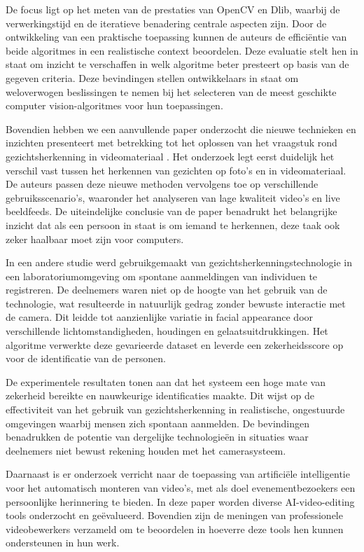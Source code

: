 De focus ligt op het meten van de prestaties van OpenCV en Dlib, waarbij de verwerkingstijd en de iteratieve benadering centrale aspecten zijn. Door de ontwikkeling van een praktische toepassing kunnen de auteurs de efficiëntie van beide algoritmes in een realistische context beoordelen. Deze evaluatie stelt hen in staat om inzicht te verschaffen in welk algoritme beter presteert op basis van de gegeven criteria. Deze bevindingen stellen ontwikkelaars in staat om weloverwogen beslissingen te nemen bij het selecteren van de meest geschikte computer vision-algoritmes voor hun toepassingen.

Bovendien hebben we een aanvullende paper onderzocht die nieuwe technieken en inzichten presenteert met betrekking tot het oplossen van het vraagstuk rond gezichtsherkenning in videomateriaal \autocite{Gorodnichy2020}. Het onderzoek legt eerst duidelijk het verschil vast tussen het herkennen van gezichten op foto's en in videomateriaal. De auteurs passen deze nieuwe methoden vervolgens toe op verschillende gebruiksscenario's, waaronder het analyseren van lage kwaliteit video's en live beeldfeeds. De uiteindelijke conclusie van de paper benadrukt het belangrijke inzicht dat als een persoon in staat is om iemand te herkennen, deze taak ook zeker haalbaar moet zijn voor computers.

In een andere studie werd gebruikgemaakt van gezichtsherkenningstechnologie in een laboratoriumomgeving om spontane aanmeldingen van individuen te registreren\autocite{Stallkamp2012}. De deelnemers waren niet op de hoogte van het gebruik van de technologie, wat resulteerde in natuurlijk gedrag zonder bewuste interactie met de camera. Dit leidde tot aanzienlijke variatie in facial appearance door verschillende lichtomstandigheden, houdingen en gelaatsuitdrukkingen. Het algoritme verwerkte deze gevarieerde dataset en leverde een zekerheidsscore op voor de identificatie van de personen.

De experimentele resultaten tonen aan dat het systeem een hoge mate van zekerheid bereikte en nauwkeurige identificaties maakte. Dit wijst op de effectiviteit van het gebruik van gezichtsherkenning in realistische, ongestuurde omgevingen waarbij mensen zich spontaan aanmelden. De bevindingen benadrukken de potentie van dergelijke technologieën in situaties waar deelnemers niet bewust rekening houden met het camerasysteem.


Daarnaast is er onderzoek verricht naar de toepassing van artificiële intelligentie voor het automatisch monteren van video's, met als doel evenementbezoekers een persoonlijke herinnering te bieden. In deze paper worden diverse AI-video-editing tools onderzocht en geëvalueerd\autocite{Soe2021}. Bovendien zijn de meningen van professionele videobewerkers verzameld om te beoordelen in hoeverre deze tools hen kunnen ondersteunen in hun werk.

